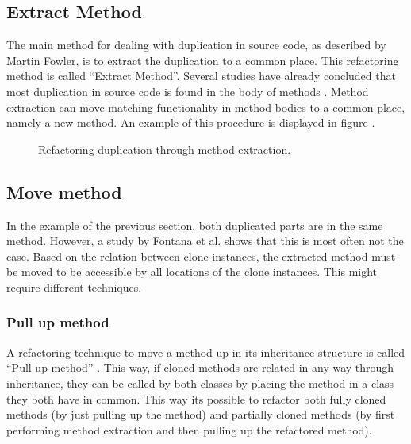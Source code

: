 \subsection{Extract Method}
The main method for dealing with duplication in source code, as described by Martin Fowler, is to extract the duplication to a common place. This refactoring method is called ``Extract Method''. Several studies have already concluded that most duplication in source code is found in the body of methods \cite{lozano2007evaluating, white2016deep, bergman2004ethnographic}. Method extraction can move matching functionality in method bodies to a common place, namely a new method. An example of this procedure is displayed in figure \cite{fig:extractmethod}.

\begin{figure}[H]
\begin{parcolumns}{2}
\end{parcolumns}
\caption{Refactoring duplication through method extraction.}
\label{fig:extractmethod}
\end{figure}

\subsection{Move method}
In the example of the previous section, both duplicated parts are in the same method. However, a study by Fontana et al. \cite{fontana2015duplicated} shows that this is most often not the case. Based on the relation between clone instances, the extracted method must be moved to be accessible by all locations of the clone instances. This might require different techniques.

\subsubsection{Pull up method}
A refactoring technique to move a method up in its inheritance structure is called ``Pull up method'' \cite{fowler2018refactoring}. This way, if cloned methods are related in any way through inheritance, they can be called by both classes by placing the method in a class they both have in common. This way its possible to refactor both fully cloned methods (by just pulling up the method) and partially cloned methods (by first performing method extraction and then pulling up the refactored method).

